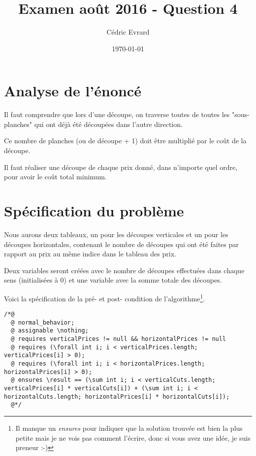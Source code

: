 \documentclass[11pt]{article}
\begin{document}
\title{Examen août 2016 - Question 4}
\author{Cédric Evrard}
\date{\today}

\maketitle

\section{Analyse de l'énoncé}

Il faut comprendre que lors d'une découpe, on traverse toutes de toutes les "sous-planches" qui ont déjà été découpées dans l'autre direction.

Ce nombre de planches (ou de découpe + 1) doit être multiplié par le coût de la découpe.

Il faut réaliser une découpe de chaque prix donné, dans n'importe quel ordre, pour avoir le coût total minimum.

\section{Spécification du problème}

Nous aurons deux tableaux, un pour les découpes verticales et un pour les découpes horizontales, contenant le nombre de découpes qui ont été faites par rapport au prix au même indice dans le tableau des prix.

Deux variables seront créées avec le nombre de découpes effectuées dans chaque sens (initialisées à 0) et une variable avec la somme totale des découpes.

Voici la spécification de la pré- et post- condition de l'algorithme\footnote{Il manque un \emph{ensures} pour indiquer que la solution trouvée est bien la plus petite mais je ne vois pas comment l'écrire, donc si vous avez une idée, je suis preneur :-)}.

\begin{lstlisting}[caption=Spécification JML de la question 4, label={lst:pre_question4}]
/*@
  @ normal_behavior;
  @ assignable \nothing;
  @ requires verticalPrices != null && horizontalPrices != null
  @ requires (\forall int i; i < verticalPrices.length; verticalPrices[i] > 0);
  @ requires (\forall int i; i < horizontalPrices.length; horizontalPrices[i] > 0);
  @ ensures \result == (\sum int i; i < verticalCuts.length; verticalPrices[i] * verticalCuts[i]) + (\sum int i; i < horizontalCuts.length; horizontalPrices[i] * horizontalCuts[i]);
  @*/
\end{lstlisting}
\end{document}

